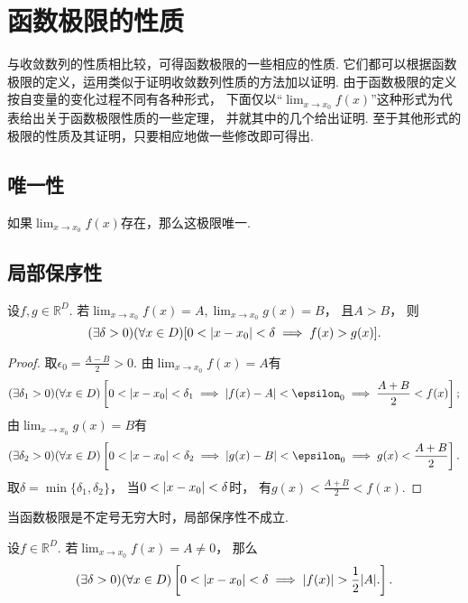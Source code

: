 \section{函数极限的性质}
与收敛数列的性质相比较，可得函数极限的一些相应的性质.
它们都可以根据函数极限的定义，运用类似于证明收敛数列性质的方法加以证明.
由于函数极限的定义按自变量的变化过程不同有各种形式，
下面仅以“\(\lim_{x \to x_0}f(x)\)”这种形式为代表给出关于函数极限性质的一些定理，
并就其中的几个给出证明.
至于其他形式的极限的性质及其证明，只要相应地做一些修改即可得出.

\subsection{唯一性}
\begin{theorem}[唯一性]\label{theorem:极限.函数极限的唯一性}
如果\(\lim_{x \to x_0} f(x)\)存在，那么这极限唯一.
\end{theorem}

\subsection{局部保序性}
\begin{theorem}[局部保序性]\label{theorem:极限.函数极限的局部保序性1}
设\(f,g\in\mathbb{R}^D\).
若\(\lim_{x\to x_0} f(x) = A,
\lim_{x\to x_0} g(x) = B\)，
且\(A>B\)，
则\[
	(\exists\delta>0)
	(\forall x\in D)
	[0<\abs{x-x_0}<\delta \implies f(x)>g(x)].
\]
\begin{proof}
取\(\epsilon_0=\frac{A-B}2>0\).
由\(\lim_{x\to x_0} f(x) = A\)有\[
	(\exists\delta_1>0)
	(\forall x\in D)
	\left[
		0<\abs{x - x_0}<\delta_1
		\implies
		\abs{f(x) - A}<\epsilon_0
		\implies
		\frac{A+B}2 < f(x)
	\right];
\]
由\(\lim_{x\to x_0} g(x) = B\)有\[
	(\exists\delta_2>0)
	(\forall x\in D)
	\left[
		0<\abs{x - x_0}<\delta_2
		\implies
		\abs{g(x) - B}<\epsilon_0
		\implies
		g(x) < \frac{A+B}2
	\right].
\]
取\(\delta=\min\{\delta_1,\delta_2\}\)，
当\(0<\abs{x-x_0}<\delta\)时，
有\(g(x) < \frac{A+B}2 < f(x)\).
\end{proof}
\end{theorem}

\begin{remark}
当函数极限是不定号无穷大时，局部保序性不成立.
\end{remark}

\begin{corollary}\label{theorem:极限.函数极限的局部保序性1.推论1}
设\(f\in\mathbb{R}^D\).
若\(\lim_{x\to x_0} f(x) = A \neq 0\)，
那么\[
	(\exists \delta>0)
	(\forall x\in D)
	\left[
		0<\abs{x-x_0}<\delta
		\implies
		\abs{f(x)}>\frac12\abs{A}.
	\right].
\]
\end{corollary}

